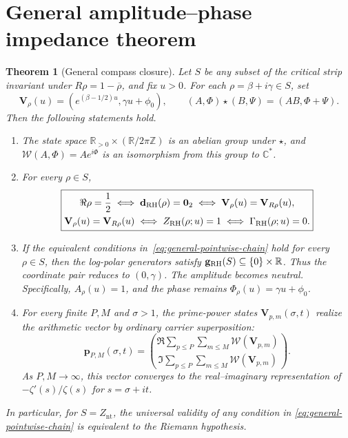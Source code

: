 \documentclass[11pt]{article}
\newtheorem{theorem}[definition]{Theorem}
\newcommand{\Znt}{Z_{\mathrm{nt}}}
\newcommand{\vzero}{\mathbf 0}
\begin{document}
\section{General amplitude--phase impedance theorem}
\begin{theorem}[General compass closure]\label{thm:general-compass}
Let $S$ be any subset of the critical strip invariant under
$R\rho=1-\overline\rho$, and fix $u>0$.  For each $\rho=\beta+i\gamma\in S$, set
\begin{equation}
 \mathbf V_\rho(u)=\left(e^{(\beta-1/2)u},\gamma u+\phi_0\right),
 \qquad
 (A,\Phi)\star(B,\Psi)=(AB,\Phi+\Psi).
\end{equation}
Then the following statements hold.

\begin{enumerate}
 \item The state space
 $\mathbb R_{>0}\times(\mathbb R/2\pi\mathbb Z)$ is an abelian group under $\star$, and
 $\mathcal W(A,\Phi)=Ae^{i\Phi}$ is an isomorphism from this group to $\mathbb C^*$.

 \item For every $\rho\in S$,
 \begin{equation}\label{eq:general-pointwise-chain}
 \boxed{\begin{gathered}
 \Re\rho=\frac12
 \iff \mathbf d_{\rm RH}(\rho)=\vzero_2
 \iff \mathbf V_\rho(u)=\mathbf V_{R\rho}(u),\\
 \mathbf V_\rho(u)=\mathbf V_{R\rho}(u)
 \iff Z_{\rm RH}(\rho;u)=1
 \iff \Gamma_{\rm RH}(\rho;u)=0.
 \end{gathered}}
 \end{equation}

 \item If the equivalent conditions in~\eqref{eq:general-pointwise-chain} hold for every
 $\rho\in S$, then the log-polar generators satisfy
 $\mathbf g_{\rm RH}(S)\subseteq\{0\}\times\mathbb R$.  Thus the coordinate pair reduces
 to $(0,\gamma)$.  The amplitude becomes neutral.  Specifically, $A_\rho(u)=1$, and the
 phase remains $\Phi_\rho(u)=\gamma u+\phi_0$.

 \item For every finite $P,M$ and $\sigma>1$, the prime-power states
 $\mathbf V_{p,m}(\sigma,t)$ realize the arithmetic vector by ordinary carrier
 superposition:
 \begin{equation}\label{eq:general-prime-realization}
  \mathbf p_{P,M}(\sigma,t)
  =\binom{\Re\displaystyle\sum_{p\le P}\sum_{m\le M}
      \mathcal W(\mathbf V_{p,m})}
     {\Im\displaystyle\sum_{p\le P}\sum_{m\le M}
      \mathcal W(\mathbf V_{p,m})}.
 \end{equation}
 As $P,M\to\infty$, this vector converges to the real--imaginary representation of
 $-\zeta'(s)/\zeta(s)$ for $s=\sigma+it$.
\end{enumerate}

In particular, for $S=\Znt$, the universal validity of any condition in
\eqref{eq:general-pointwise-chain} is equivalent to the Riemann hypothesis.
\end{theorem}
\end{document}
